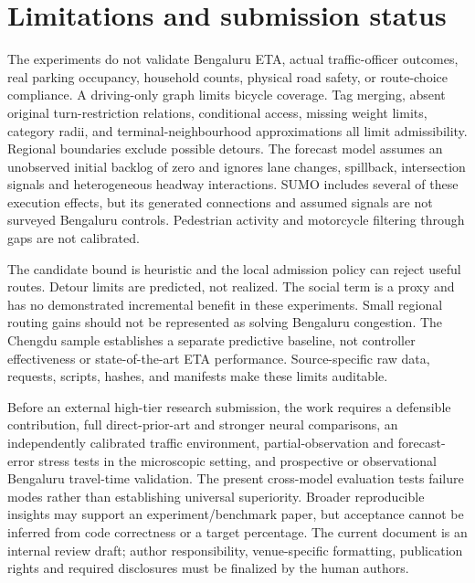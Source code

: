 \documentclass[sigconf,anonymous,review]{acmart}
\begin{document}
\section{Limitations and submission status}
The experiments do not validate Bengaluru ETA, actual traffic-officer outcomes, real parking occupancy, household counts, physical road safety, or route-choice compliance. A driving-only graph limits bicycle coverage. Tag merging, absent original turn-restriction relations, conditional access, missing weight limits, category radii, and terminal-neighbourhood approximations all limit admissibility. Regional boundaries exclude possible detours. The forecast model assumes an unobserved initial backlog of zero and ignores lane changes, spillback, intersection signals and heterogeneous headway interactions. SUMO includes several of these execution effects, but its generated connections and assumed signals are not surveyed Bengaluru controls. Pedestrian activity and motorcycle filtering through gaps are not calibrated.

The candidate bound is heuristic and the local admission policy can reject useful routes. Detour limits are predicted, not realized. The social term is a proxy and has no demonstrated incremental benefit in these experiments. Small regional routing gains should not be represented as solving Bengaluru congestion. The Chengdu sample establishes a separate predictive baseline, not controller effectiveness or state-of-the-art ETA performance. Source-specific raw data, requests, scripts, hashes, and manifests make these limits auditable.

Before an external high-tier research submission, the work requires a defensible contribution, full direct-prior-art and stronger neural comparisons, an independently calibrated traffic environment, partial-observation and forecast-error stress tests in the microscopic setting, and prospective or observational Bengaluru travel-time validation. The present cross-model evaluation tests failure modes rather than establishing universal superiority. Broader reproducible insights may support an experiment/benchmark paper, but acceptance cannot be inferred from code correctness or a target percentage. The current document is an internal review draft; author responsibility, venue-specific formatting, publication rights and required disclosures must be finalized by the human authors.
\end{document}
